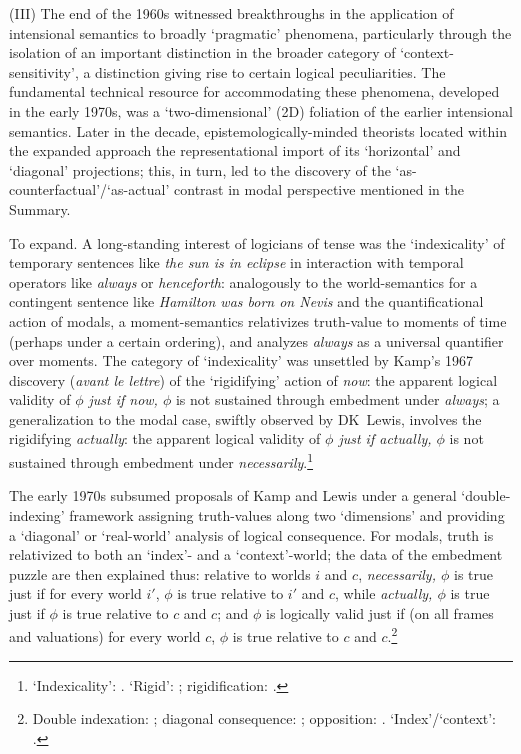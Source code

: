 \documentclass[12pt]{article}
\begin{document}
\smallskip{}

(III) The end of the 1960s witnessed breakthroughs in the application of
intensional semantics to broadly `pragmatic' phenomena, particularly through
the isolation of an important distinction in the broader category of
`context-sensitivity', a distinction giving rise to certain logical
peculiarities. The fundamental technical resource for accommodating these
phenomena, developed in the early 1970s, was a `two-dimensional' (2D)
foliation of the earlier intensional semantics. Later in the decade,
epistemologically-minded theorists located within the expanded approach the
representational import of its `horizontal' and `diagonal' projections; this,
in turn, led to the discovery of the `as-counterfactual'/`as-actual' contrast
in modal perspective mentioned in the Summary.

To expand. A long-standing interest of logicians of tense was the
`indexicality' of temporary sentences like \emph{the sun is in eclipse} in
interaction with temporal operators like \emph{always} or \emph{henceforth}:
analogously to the world-semantics for a contingent sentence like
\emph{Hamilton was born on Nevis} and the quantificational action of modals, a
moment-semantics relativizes truth-value to moments of time (perhaps under a
certain ordering), and analyzes \emph{always} as a universal quantifier over
moments. The category of `indexicality' was unsettled by Kamp's 1967 discovery
(\emph{avant le lettre}) of the `rigidifying' action of \emph{now}: the
apparent logical validity of \emph{$\phi$ just if now, $\phi$} is not
sustained through embedment under \emph{always}; a generalization to the modal
case, swiftly observed by DK~Lewis, involves the rigidifying \emph{actually}:
the apparent logical validity of \emph{$\phi$ just if actually, $\phi$} is not
sustained through embedment under \emph{necessarily}.\footnote{`Indexicality':
\citep{montagueprag,montaguepragil,lewis70gs}. `Rigid': \citep{kripke72};
rigidification: \citep{kamp68,kamp71,Prior1968-PRIN-3,lewis70}.}

The early 1970s subsumed proposals of Kamp and Lewis under a general
`double-indexing' framework assigning truth-values along two `dimensions' and
providing a `diagonal' or `real-world' analysis of logical consequence. For
modals, truth is relativized to both an `index'- and a `context'-world; the
data of the embedment puzzle are then explained thus: relative to worlds $i$
and $c$, \emph{necessarily, $\phi$} is true just if for every world $i'$,
$\phi$ is true relative to $i'$ and $c$, while \emph{actually, $\phi$} is true
just if $\phi$ is true relative to $c$ and $c$; and $\phi$ is logically valid
just if (on all frames and valuations) for every world $c$, $\phi$ is true
relative to $c$ and $c$.\footnote{Double indexation: \citep{segerberg73};
diagonal consequence:
\citep{Vlach1973-VLANAT,kaplan77,fritz11,Fritz2014-FRIWIT-2}; opposition:
\citep{crossleyhumberstone77,davieshumberstone81,Hanson2006-HANANA-5,Hanson2014-HANLTI}.
`Index'/`context': \citep{lewis80icc}.}
\end{document}
